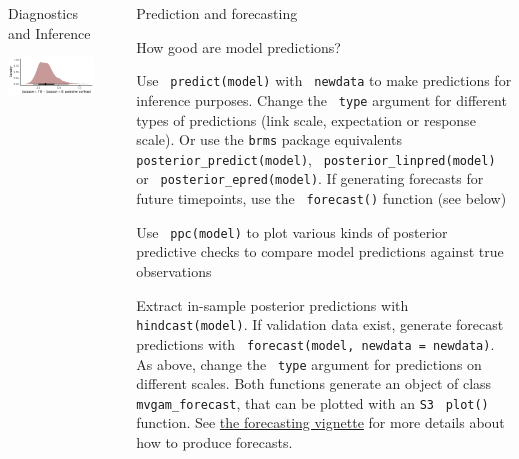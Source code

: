 \documentclass[final,9pt,fleqn]{beamer}\usepackage[]{graphicx}\usepackage[]{xcolor}
\makeatletter
\def\maxwidth{ %
  \ifdim\Gin@nat@width>\linewidth
    \linewidth
  \else
    \Gin@nat@width
  \fi
}
\newenvironment{knitrout}{}{} %
\makeatother
\begin{document}
\begin{frame}[fragile]
\begin{columns}
\begin{column}{0.3\paperwidth}
\begin{block}{{\fontsize{21}{21} \selectfont \color{BrickRed} Diagnostics and Inference}}
\begin{knitrout}
{\centering \includegraphics[width=\maxwidth]{figure/unnamed-chunk-6-1} 

}


\end{knitrout}

\end{block}
\end{column}


\begin{column}{.03\paperwidth}
\end{column}


\begin{column}{0.3\paperwidth}
\vspace{0.37in}
\noindent\makebox[\linewidth]{\rule{0.3\paperwidth}{0.2pt}}
\begin{block}{{\fontsize{21}{21} \selectfont \color{BrickRed} Prediction and forecasting}}

\smallskip
{{\fontsize{11}{11} \selectfont \color{mygray} How good are model predictions?}}

\medskip
Use \texttt{\color{Orchid} predict(model)} with \texttt{\color{Orchid} newdata} to make predictions for inference purposes. Change the \texttt{\color{Orchid} type} argument for different types of predictions (link scale, expectation or response scale). Or use the \texttt{brms} package equivalents \texttt{\color{Orchid} posterior\_predict(model)}, \texttt{\color{Orchid} posterior\_linpred(model)} or \texttt{\color{Orchid} posterior\_epred(model)}. If generating forecasts for future timepoints, use the \texttt{\color{Orchid} forecast()} function (see below)

\medskip
Use \texttt{\color{Orchid} ppc(model)} to plot various kinds of posterior predictive checks to compare model predictions against true observations

\medskip
Extract in-sample posterior predictions with \texttt{\color{Orchid} hindcast(model)}. If validation data exist, generate forecast predictions with \texttt{\color{Orchid} forecast(model, newdata = newdata)}. As above, change the \texttt{\color{Orchid} type} argument for predictions on different scales. Both functions generate an object of class \texttt{mvgam\_forecast}, that can be plotted with an \texttt{S3} \texttt{\color{Orchid} plot()} function. See \href{https://nicholasjclark.github.io/mvgam/articles/forecast_evaluation.html}{the forecasting vignette} for more details about how to produce forecasts.


\end{block}
\end{column}
\end{columns}
\end{frame}
\end{document}
